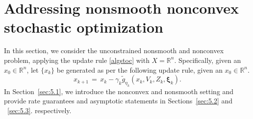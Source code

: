 \documentclass[11pt,reqno]{amsart}
\newcommand{\1}{{\bf 1}}
\newcommand{\2}{{\bf 2}}
\newcommand{\bxi}{\boldsymbol{\xi}}
\newcommand{\E}{\mathbb E}
\newcommand{\R}{\mathbb R}
\newcommand{\cO}{\mathcal O}
\numberwithin{equation}{section}
\theoremstyle{remark}
\begin{document}
{
	\section{Addressing {nonsmooth nonconvex stochastic optimization}}\label{sec:Nonconv}
	In this section, we consider the unconstrained nonsmooth and nonconvex problem, applying the update rule \eqref{algstoc} with $X=\R^n$. {Specifically, given an $x_0 \in \R^n$, let $\{x_k\}$ be generated as per the following update rule, given an $x_0 \in \mathbb{R}^n.$}
	\begin{equation}\label{eq:updateRn}
		x_{k+1}\, = \, x_{k}-\gamma_{k}\tilde{g}_{\eta_k}(x_k, V_k, Z_k, \bxi_k).
	\end{equation}
	In Section~\ref{sec:5.1}, we introduce the nonconvex and nonsmooth setting and provide rate guarantees and asymptotic statements in Sections~\ref{sec:5.2} and ~\ref{sec:5.3}. respectively.
	
}
\end{document}
